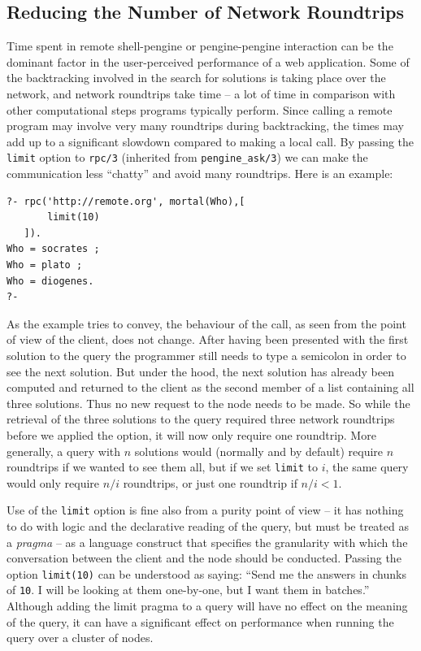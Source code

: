 \documentclass{tlp}
\begin{document}
\subsection{Reducing the Number of Network Roundtrips}\label{sec:reducing-roundtrips}

Time spent in remote shell-pengine or pengine-pengine interaction can be the dominant factor in the user-perceived performance of a web application. Some of the backtracking involved in the search for solutions is taking place over the network, and network roundtrips take time -- a lot of time in comparison with other computational steps programs typically perform. Since calling a remote program may involve very many roundtrips during backtracking, the times may add up to a significant slowdown compared to making a local call. By passing the \texttt{limit} option to \texttt{rpc/3} (inherited from \texttt{pengine\_ask/3}) we can make the communication less ``chatty'' and avoid many roundtrips. Here is an example:

\begin{lstlisting}
?- rpc('http://remote.org', mortal(Who),[
       limit(10)
   ]).
Who = socrates ;
Who = plato ;
Who = diogenes.
?-
\end{lstlisting}

\noindent As the example tries to convey, the behaviour of the call, as seen from the point of view of the client, does not change. After having been presented with the first solution to the query the programmer still needs to type a semicolon in order to see the next solution. But under the hood, the next solution has already been computed and returned to the client as the second member of a list containing all three solutions. Thus no new request to the node needs to be made. So while the retrieval of the three solutions to the query required three network roundtrips before we applied the option, it will now only require one roundtrip. More generally, a query with $n$ solutions would (normally and by default) require $n$ roundtrips if we wanted to see them all, but if we set \texttt{limit} to $i$, the same query would only require $n/i$ roundtrips, or just one roundtrip if $n/i < 1$.

Use of the \texttt{limit} option is fine also from a purity point of view -- it has nothing to do with logic and the declarative reading of the query, but must be treated as a \textit{pragma} -- as a language construct that specifies the granularity with which the conversation between the client and the node should be conducted. Passing the option \texttt{limit(10)} can be understood as saying: ``Send me the answers in chunks of \texttt{10}. I will be looking at them one-by-one, but I want them in batches.'' Although adding the limit pragma to a query will have no effect on the meaning of the query, it can have a significant effect on performance when running the query over a cluster of nodes.
\end{document}
